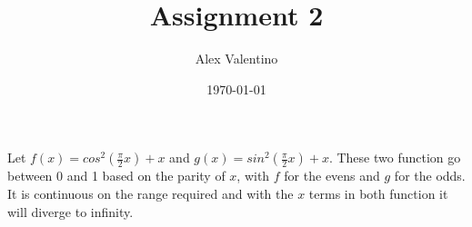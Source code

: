 \documentclass[12pt, letterpaper]{article}
\date{\today}
\author{Alex Valentino}
\title{Assignment 2}
\begin{document}
	Let $f(x) = cos^2(\frac{\pi}{2}x)+x$ and $g(x) = sin^2(\frac{\pi}{2}x)+x$.  These two function go between 0 and 1 based on the parity of $x$, with $f$ for the evens and $g$ for the odds.  It is continuous on the range required and with the $x$ terms in both function it will diverge to infinity.
\end{document}
